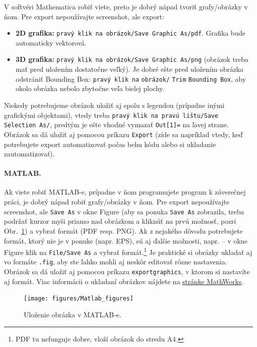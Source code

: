 V softvéri Mathematica robiť viete, preto je dobrý nápad tvoriť grafy/obrázky v ňom. Pre export nepoužívajte screenshot, ale export:
\begin{itemize}
	\item \textbf{2D grafika:} \verb|pravý klik na obrázok/Save Graphic As/pdf|. Grafika bude automaticky vektorová.
	\item \textbf{3D grafika:} \verb|pravý klik na obrázok/Save Graphic As/png| (obrázok treba mať pred uložením dostatočne veľký). Je dobré ešte pred uložením obrázka odstrániť Bounding Box: \verb|pravý klik na| \verb|obrázok/| \verb|Trim| \verb|Bounding Box|, aby okolo obrázka nebolo zbytočne veľa bielej plochy.
\end{itemize}
Niekedy potrebujeme obrázok uložiť aj spolu s legendou (prípadne inými grafickými objektami), vtedy treba \verb|pravý klik na pravú lištu/Save Selection As/|, predtým je ešte vhodné vymazať \verb|Out[1]=| na ľavej strane. Obrázok sa dá uložiť aj pomocou príkazu \verb|Export| (zíde sa napríklad vtedy, keď potrebujete export automatizovať počas behu kódu alebo si ukladanie zautomatizovať).


\paragraph{MATLAB.}

Ak viete robiť MATLAB-e, prípadne v ňom programujete program k záverečnej práci, je dobrý nápad robiť grafy/obrázky v ňom. Pre export nepoužívajte screenshot, ale \verb|Save As| v okne Figure (aby sa ponuka \verb|Save As| zobrazila, treba podržať kurzor myši priamo nad obrázkom a kliknúť na prvú možnosť, pozri Obr.~\ref{fig:matlabfigures}) a vybrať formát (PDF resp. PNG). Ak z nejakého dôvodu potrebujete formát, ktorý nie je v ponuke (napr. EPS), sú aj ďalšie možnosti, napr. -- v okne Figure klik na \verb|File/Save As| a vybrať formát.\footnote{PDF tu nefunguje dobre, vloží obrázok do stredu A4.} Je praktické si obrázky ukladať aj vo formáte \verb|.fig|, aby ste ľahko mohli aj neskôr editovať rôzne nastavenia. Obrázok sa dá uložiť aj pomocou príkazu \verb|exportgraphics|, v ktorom si nastavíte aj formát. Viac informácii o ukladaní obrázkov nájdete na   \href{https://www.mathworks.com/help/matlab/creating_plots/save-figure-with-minimal-white-space.html}{stránke MathWorks}.
\begin{figure}[h!]
	\centering
	\texttt{[image: figures/Matlab\_figures]}
	\caption{Uloženie obrázka v MATLAB-e.}
	\label{fig:matlabfigures}
\end{figure}



